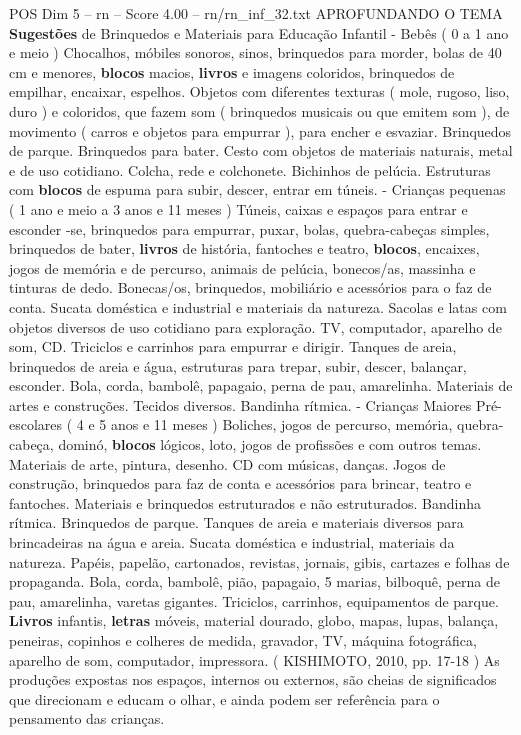 \begin{textsample}{POS Dim 5 – rn – Score 4.00 – rn/rn\_inf\_32.txt}  \label{ex:f5_pos_148}
APROFUNDANDO O TEMA \textbf{Sugestões} de Brinquedos e Materiais para Educação Infantil - Bebês ( 0 a 1 ano e meio ) Chocalhos, móbiles sonoros, sinos, brinquedos para morder, bolas de 40 cm e menores, \textbf{blocos} macios, \textbf{livros} e imagens coloridos, brinquedos de empilhar, encaixar, espelhos.
Objetos com diferentes texturas ( mole, rugoso, liso, duro ) e coloridos, que fazem som ( brinquedos musicais ou que emitem som ), de movimento ( carros e objetos para empurrar ), para encher e esvaziar.
Brinquedos de parque.
Brinquedos para bater.
Cesto com objetos de materiais naturais, metal e de uso cotidiano.
Colcha, rede e colchonete.
Bichinhos de pelúcia.
Estruturas com \textbf{blocos} de espuma para subir, descer, entrar em túneis. - Crianças pequenas ( 1 ano e meio a 3 anos e 11 meses ) Túneis, caixas e espaços para entrar e esconder -se, brinquedos para empurrar, puxar, bolas, quebra-cabeças simples, brinquedos de bater, \textbf{livros} de história, fantoches e teatro, \textbf{blocos}, encaixes, jogos de memória e de percurso, animais de pelúcia, bonecos/as, massinha e tinturas de dedo.
Bonecas/os, brinquedos, mobiliário e acessórios para o faz de conta.
Sucata doméstica e industrial e materiais da natureza.
Sacolas e latas com objetos diversos de uso cotidiano para exploração.
TV, computador, aparelho de som, CD.
Triciclos e carrinhos para empurrar e dirigir.
Tanques de areia, brinquedos de areia e água, estruturas para trepar, subir, descer, balançar, esconder.
Bola, corda, bambolê, papagaio, perna de pau, amarelinha.
Materiais de artes e construções.
Tecidos diversos.
Bandinha rítmica. - Crianças Maiores Pré-escolares ( 4 e 5 anos e 11 meses ) Boliches, jogos de percurso, memória, quebra-cabeça, dominó, \textbf{blocos} lógicos, loto, jogos de profissões e com outros temas.
Materiais de arte, pintura, desenho.
CD com músicas, danças.
Jogos de construção, brinquedos para faz de conta e acessórios para brincar, teatro e fantoches.
Materiais e brinquedos estruturados e não estruturados.
Bandinha rítmica.
Brinquedos de parque.
Tanques de areia e materiais diversos para brincadeiras na água e areia.
Sucata doméstica e industrial, materiais da natureza.
Papéis, papelão, cartonados, revistas, jornais, gibis, cartazes e folhas de propaganda.
Bola, corda, bambolê, pião, papagaio, 5 marias, bilboquê, perna de pau, amarelinha, varetas gigantes.
Triciclos, carrinhos, equipamentos de parque. \textbf{Livros} infantis, \textbf{letras} móveis, material dourado, globo, mapas, lupas, balança, peneiras, copinhos e colheres de medida, gravador, TV, máquina fotográfica, aparelho de som, computador, impressora. ( KISHIMOTO, 2010, pp. 17-18 ) As produções expostas nos espaços, internos ou externos, são cheias de significados que direcionam e educam o olhar, e ainda podem ser referência para o pensamento das crianças.

\end{textsample}
